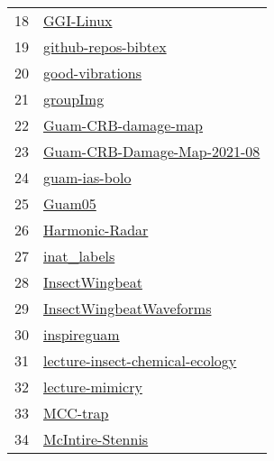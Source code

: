 \begin{longtable}{rl}
	18 &                                                     \href{https://github.com/aubreymoore/GGI-Linux}{GGI-Linux} \\
	19 &                                 \href{https://github.com/aubreymoore/github-repos-bibtex}{github-repos-bibtex} \\
	20 &                                         \href{https://github.com/aubreymoore/good-vibrations}{good-vibrations} \\
	21 &                                                       \href{https://github.com/aubreymoore/groupImg}{groupImg} \\
	22 &                                 \href{https://github.com/aubreymoore/Guam-CRB-damage-map}{Guam-CRB-damage-map} \\
	23 &                 \href{https://github.com/aubreymoore/Guam-CRB-Damage-Map-2021-08}{Guam-CRB-Damage-Map-2021-08} \\
	24 &                                             \href{https://github.com/aubreymoore/guam-ias-bolo}{guam-ias-bolo} \\
	25 &                                                           \href{https://github.com/aubreymoore/Guam05}{Guam05} \\
	26 &                                           \href{https://github.com/aubreymoore/Harmonic-Radar}{Harmonic-Radar} \\
	27 &                                                 \href{https://github.com/aubreymoore/inat_labels}{inat\_labels} \\
	28 &                                           \href{https://github.com/aubreymoore/InsectWingbeat}{InsectWingbeat} \\
	29 &                         \href{https://github.com/aubreymoore/InsectWingbeatWaveforms}{InsectWingbeatWaveforms} \\
	30 &                                                 \href{https://github.com/aubreymoore/inspireguam}{inspireguam} \\
	31 &         \href{https://github.com/aubreymoore/lecture-insect-chemical-ecology}{lecture-insect-chemical-ecology} \\
	32 &                                         \href{https://github.com/aubreymoore/lecture-mimicry}{lecture-mimicry} \\
	33 &                                                       \href{https://github.com/aubreymoore/MCC-trap}{MCC-trap} \\
	34 &                                       \href{https://github.com/aubreymoore/McIntire-Stennis}{McIntire-Stennis} \\

\end{longtable}

